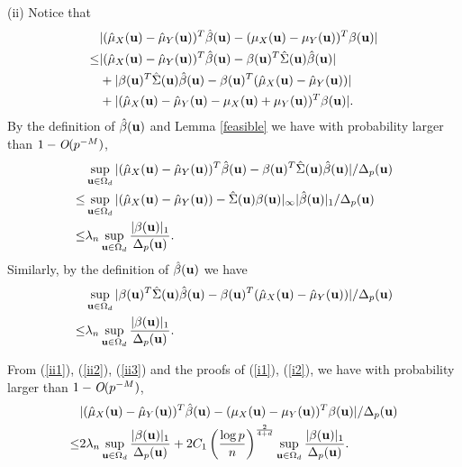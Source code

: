 \documentclass[11pt]{article}
\theoremstyle{definition}
\begin{document}
 
 (ii) Notice that
 \begin{align}\label{ii1}
 	&|(\hat{\mu}_X({\bf u})-\hat{\mu}_Y({\bf u}))^T\hat{\beta}({\bf u})- (\mu_X({\bf u})-\mu_Y({\bf u}))^T\beta({\bf u})|  \\  \leq&
 	|(\hat{\mu}_X({\bf u})-\hat{\mu}_Y({\bf u}))^T\hat{\beta}({\bf u})- \beta({\bf u})^T\hat{\Sigma}({\bf u})\hat{\beta}({\bf u})| \nonumber\\ &+
 	|\beta({\bf u})^T\hat{\Sigma}({\bf u})\hat{\beta}({\bf u})-\beta({\bf u})^T(\hat{\mu}_X({\bf u})-\hat{\mu}_Y({\bf u}))|  \nonumber\\
 	&+|(\hat{\mu}_X({\bf u})-\hat{\mu}_Y({\bf u})-\mu_X({\bf u})+\mu_Y({\bf u}))^T\beta({\bf u})|.\nonumber
 \end{align}
 By the definition of $\hat{\beta}({\bf u})$ and Lemma \ref{feasible} we have with probability larger than $1-\emph{O}(p^{-M})$,
 \begin{align}\label{ii2}
 	& \sup_{{\bf u}\in \Omega_d}|(\hat{\mu}_X({\bf u})-\hat{\mu}_Y({\bf u}))^T\hat{\beta}({\bf u})- \beta({\bf u})^T\hat{\Sigma}({\bf u})\hat{\beta}({\bf u})|/\Delta_p({\bf u})
 	\\ \leq & \sup_{{\bf u}\in \Omega_d}|(\hat{\mu}_X({\bf u})-\hat{\mu}_Y({\bf u}))-\hat{\Sigma}({\bf u})\beta({\bf u})|_{\infty} |\hat{\beta}({\bf u})|_1/\Delta_p({\bf u})\nonumber\\
 	\leq&  \lambda_n\sup_{{\bf u}\in \Omega_d}\frac{|\beta({\bf u})|_1}{\Delta_p({\bf u})}.\nonumber
 \end{align}
 Similarly, by the definition of $\hat{\beta}({\bf u})$ we have
 \begin{align}\label{ii3}
 	&\sup_{{\bf u}\in \Omega_d} |\beta({\bf u})^T\hat{\Sigma}({\bf u})\hat{\beta}({\bf u})-\beta({\bf u})^T(\hat{\mu}_X({\bf u})-\hat{\mu}_Y({\bf u}))|/\Delta_p({\bf u}) \\
 	\leq& {\lambda_n} \sup_{{\bf u}\in \Omega_d}\frac{|\beta({\bf u})|_1}{\Delta_p({\bf u})}. \nonumber
 \end{align}
 
 
 From (\ref{ii1}), (\ref{ii2}), (\ref{ii3}) and the proofs of (\ref{i1}), (\ref{i2}), we have with probability larger than $1-\emph{O}(p^{-M})$,
 \begin{align}\label{ii}
 	&|(\hat{\mu}_X({\bf u})-\hat{\mu}_Y({\bf u}))^T\hat{\beta}({\bf u})- (\mu_X({\bf u})-\mu_Y({\bf u}))^T\beta({\bf u})|/\Delta_p({\bf u})    \\
 	\leq&
 	2\lambda_n\sup_{{\bf u}\in \Omega_d}\frac{|\beta({\bf u})|_1}{\Delta_p({\bf u})}+2 C_1\left(\frac{\log p}{n}\right)^{\frac{2}{4+d}}  \sup_{{\bf u}\in \Omega_d}\frac{|\beta({\bf u})|_1}{\Delta_p({\bf u})}.\nonumber
 \end{align}
 
\end{document}

